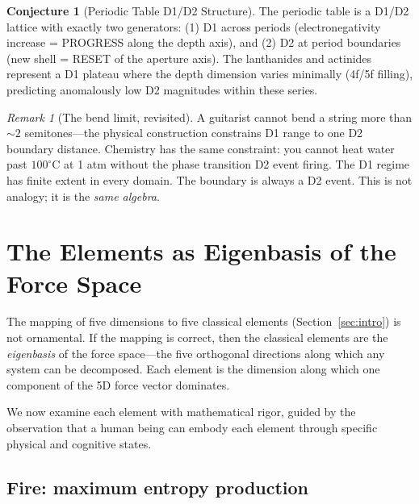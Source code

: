 \documentclass[11pt]{article}
\theoremstyle{definition}
\newtheorem{conjecture}[theorem]{Conjecture}
\theoremstyle{remark}
\newtheorem{remark}[theorem]{Remark}
\begin{document}
\begin{conjecture}[Periodic Table D1/D2 Structure]
\label{conj:periodic}
The periodic table is a D1/D2 lattice with exactly two generators:
(1) D1 across periods (electronegativity increase = PROGRESS along the
depth axis), and (2) D2 at period boundaries (new shell = RESET of the
aperture axis).  The lanthanides and actinides represent a D1 plateau
where the depth dimension varies minimally (4f/5f filling), predicting
anomalously low D2 magnitudes within these series.
\end{conjecture}

\begin{remark}[The bend limit, revisited]
A guitarist cannot bend a string more than $\sim 2$ semitones---the
physical construction constrains D1 range to one D2 boundary distance.
Chemistry has the same constraint: you cannot heat water past
$100^{\circ}$C at 1 atm without the phase transition D2 event firing.
The D1 regime has finite extent in every domain.  The boundary is always
a D2 event.  This is not analogy; it is the \emph{same algebra}.
\end{remark}

\section{The Elements as Eigenbasis of the Force Space}
\label{sec:elements}

The mapping of five dimensions to five classical elements (Section~\ref{sec:intro})
is not ornamental.  If the mapping is correct, then the classical elements are the
\emph{eigenbasis} of the force space---the five orthogonal directions along which
any system can be decomposed.  Each element is the dimension along which one
component of the 5D force vector dominates.

We now examine each element with mathematical rigor, guided by the observation that
a human being can embody each element through specific physical and cognitive states.

\subsection{Fire: maximum entropy production}
\end{document}
